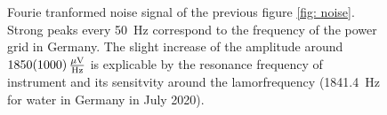 \begin{figure}[H]
    \centering
    
    \caption[Fourie tranformed noise signal of the previous figure \ref{fig: noise}.]{Fourie tranformed noise signal of the previous figure \ref{fig: noise}. Strong peaks every \SI{50}{\hertz} correspond to the frequency of the power grid in Germany. The slight increase of the amplitude around $\SI{1850 \pm 1000}{\frac{\mu \volt}{\hertz}}$ is explicable by the resonance frequency of instrument and its sensitvity around the lamorfrequency (\SI{1841.4}{\hertz} for water in Germany in July 2020).}
    \label{fig: MonitorNoise138}
\end{figure}


